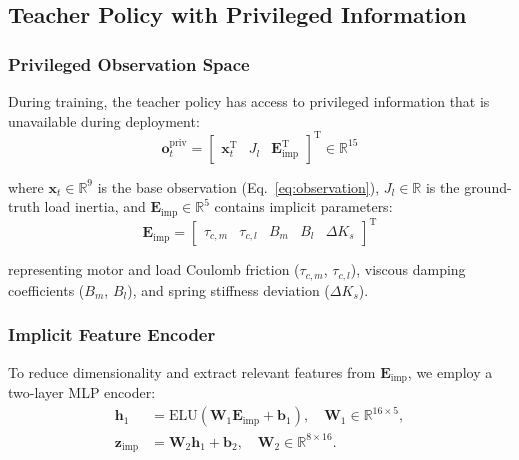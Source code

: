 \documentclass[lettersize,journal]{IEEEtran}
\begin{document}
\subsection{Teacher Policy with Privileged Information}

\subsubsection{Privileged Observation Space}

During training, the teacher policy has access to privileged information that is unavailable during deployment:
\begin{equation}
\bm{o}_t^{\text{priv}} = \begin{bmatrix}
\bm{x}_t^\mathrm{T} & J_l & \bm{E}_{\text{imp}}^\mathrm{T}
\end{bmatrix}^\mathrm{T} \in \mathbb{R}^{15} \label{eq:priv_obs}
\end{equation}

\noindent where $\bm{x}_t \in \mathbb{R}^9$ is the base observation (Eq.~\ref{eq:observation}), $J_l \in \mathbb{R}$ is the ground-truth load inertia, and $\bm{E}_{\text{imp}} \in \mathbb{R}^5$ contains implicit parameters:
\begin{equation}
\bm{E}_{\text{imp}} = \begin{bmatrix}
\tau_{c,m} & \tau_{c,l} & B_m & B_l & \Delta K_s
\end{bmatrix}^\mathrm{T} \label{eq:implicit_params}
\end{equation}

\noindent representing motor and load Coulomb friction ($\tau_{c,m}$, $\tau_{c,l}$), viscous damping coefficients ($B_m$, $B_l$), and spring stiffness deviation ($\Delta K_s$).

\subsubsection{Implicit Feature Encoder}

To reduce dimensionality and extract relevant features from $\bm{E}_{\text{imp}}$, we employ a two-layer MLP encoder:
\begin{equation}
\begin{aligned}
\bm{h}_1 &= \text{ELU}(\bm{W}_1 \bm{E}_{\text{imp}} + \bm{b}_1), \quad \bm{W}_1 \in \mathbb{R}^{16 \times 5}, \\
\bm{z}_{\text{imp}} &= \bm{W}_2 \bm{h}_1 + \bm{b}_2, \quad \bm{W}_2 \in \mathbb{R}^{8 \times 16}.
\end{aligned}
\label{eq:encoder_z}
\end{equation}
\end{document}
